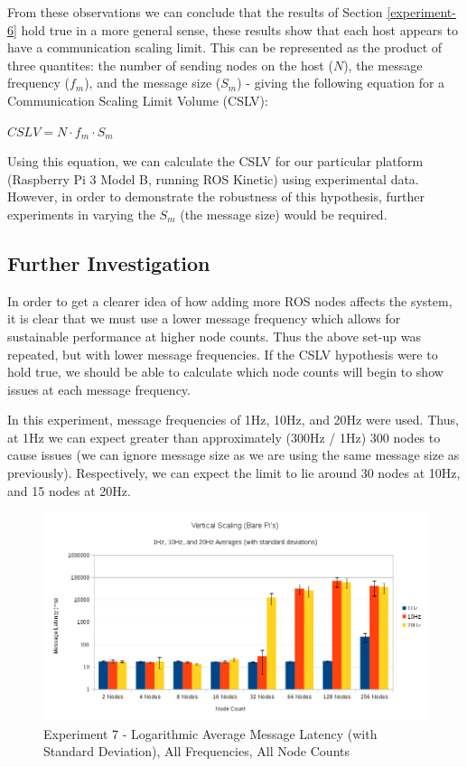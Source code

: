 \documentclass[../dissertation.tex]{subfiles}
\begin{document}
From these observations we can conclude that the results of Section \ref{experiment-6} hold true in a more general sense, these results show that each host appears to have a communication scaling limit. This can be represented as the product of three quantites: the number of sending nodes on the host ($N$), the message frequency ($f_m$), and the message size ($S_m$) - giving the following equation for a Communication Scaling Limit Volume (CSLV):

\begin{center}
$CSLV = N \cdot f_m \cdot S_m$
\end{center}

Using this equation, we can calculate the CSLV for our particular platform (Raspberry Pi 3 Model B, running ROS Kinetic) using experimental data. However, in order to demonstrate the robustness of this hypothesis, further experiments in varying the $S_m$ (the message size) would be required.

\subsection{Further Investigation}
\label{exp-7-further}

In order to get a clearer idea of how adding more ROS nodes affects the system, it is clear that we must use a lower message frequency which allows for sustainable performance at higher node counts. Thus the above set-up was repeated, but with lower message frequencies. If the CSLV hypothesis were to hold true, we should be able to calculate which node counts will begin to show issues at each message frequency.

In this experiment, message frequencies of 1Hz, 10Hz, and 20Hz were used. Thus, at 1Hz we can expect greater than approximately (300Hz / 1Hz) 300 nodes to cause issues (we can ignore message size as we are using the same message size as previously). Respectively, we can expect the limit to lie around 30 nodes at 10Hz, and 15 nodes at 20Hz.

\begin{figure}[H]
\centering
\includegraphics[width=\textwidth]{images/experiment8/vertical_scaling_all_freqs_log_avg_msg_latency.png}
\caption{Experiment 7 - Logarithmic Average Message Latency (with Standard Deviation), All Frequencies, All Node Counts}
\label{exp7-further-all-freqs-averages}
\end{figure}
\end{document}
